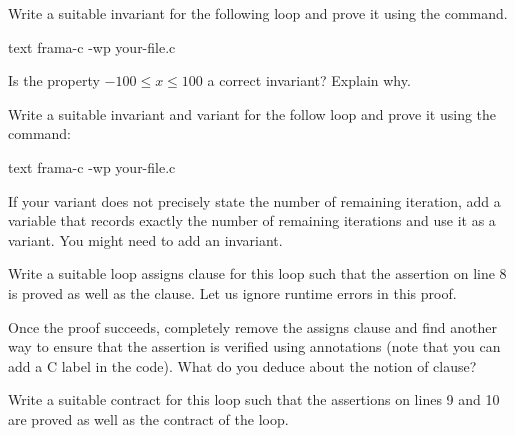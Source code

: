 


Write a suitable invariant for the following loop and prove it using
the command.

\begin{CodeBlock}{text}
frama-c -wp your-file.c
\end{CodeBlock}




Is the property $-100 \leq x \leq 100$ a correct invariant? Explain why.





Write a suitable invariant and variant for the follow loop and prove it
using the command:

\begin{CodeBlock}{text}
frama-c -wp your-file.c
\end{CodeBlock}




If your variant does not precisely state the number of remaining
iteration, add a variable that records exactly the number of remaining
iterations and use it as a variant. You might need to add an invariant.





Write a suitable loop assigns clause for this loop such that the assertion
on line 8 is proved as well as the  clause. Let us ignore
runtime errors in this proof.






Once the proof succeeds, completely remove the assigns clause and find
another way to ensure that the assertion is verified using annotations (note
that you can add a C label in the code). What do you deduce about the notion
of  clause?





Write a suitable contract for this loop such that the assertions on lines
9 and 10 are proved as well as the contract of the loop.


